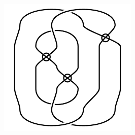 \begin{figure}[H]
\begin{minipage}[b]{.18\linewidth}
\end{minipage}
\begin{minipage}[b]{.18\linewidth}
\centering
\includegraphics[width=\linewidth]{../data/virtual_4_6.png}
\end{minipage}
\end{figure}

